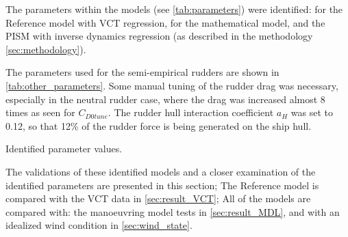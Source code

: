 The parameters within the models (see \autoref{tab:parameters}) were identified: for the Reference model with VCT regression, for the mathematical model, and the PISM with inverse dynamics regression (as described in the methodology \autoref{sec:methodology}). 

The parameters used for the semi-empirical rudders are shown in \autoref{tab:other_parameters}. Some manual tuning of the rudder drag was necessary, especially in the neutral rudder case, where the drag was increased almost 8 times as seen for $C_{D0tune}$. The rudder hull interaction coefficient $a_H$ was set to 0.12, so that 12\% of the rudder force is being generated on the ship hull.
\begin{table}[h]
    \centering
    \caption{Identified parameter values.}
    \label{tab:parameters}
\end{table}

The validations of these identified models and a closer examination of the identified parameters are presented in this section; The Reference model is compared with the VCT data in \autoref{sec:result_VCT}; All of the models are compared with: the manoeuvring model tests in \autoref{sec:result_MDL}, and with an idealized wind condition in \autoref{sec:wind_state}.